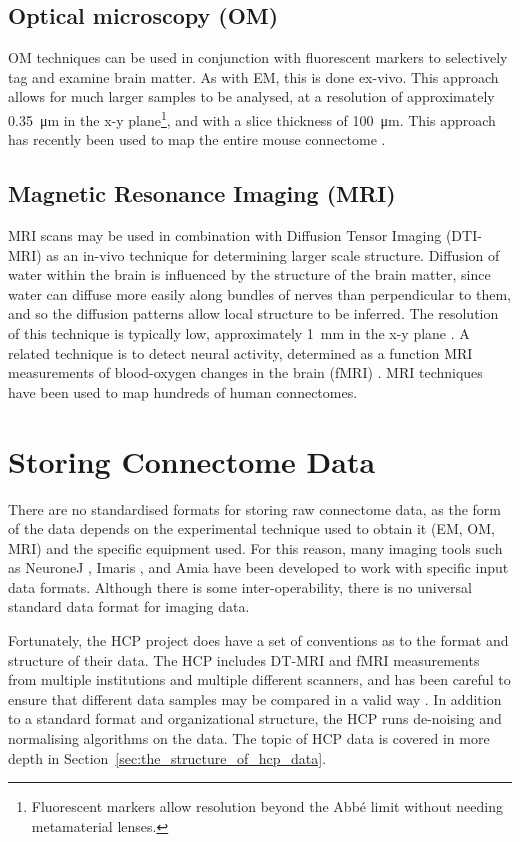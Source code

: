\documentclass[MSc,paper=a4,pagesize=auto]{icldt}
\begin{document}
\subsection{Optical microscopy (OM)} 
OM techniques can be used in conjunction with fluorescent markers to selectively tag and examine brain matter. As with EM, this is done ex-vivo. This approach allows for much larger samples to be analysed, at a resolution of approximately \SI{0.35}{\um} in the x-y plane\footnote{Fluorescent markers allow resolution beyond the Abbé limit without needing metamaterial lenses.}, and with a slice thickness of \SI{100}{\um}. This approach has recently been used to map the entire mouse connectome \cite{Oh2014}. 

\subsection{Magnetic Resonance Imaging (MRI)} 
MRI scans may be used in combination with Diffusion Tensor Imaging (DTI-MRI) as an in-vivo technique for determining larger scale structure. Diffusion of water within the brain is influenced by the structure of the brain matter, since water can diffuse more easily along bundles of nerves than perpendicular to them, and so the diffusion patterns allow local structure to be inferred. The resolution of this technique is typically low, approximately \SI{1}{\mm} in the x-y plane \cite{Westin2002}. A related technique is to detect neural activity, determined as a function MRI measurements of blood-oxygen changes in the brain (fMRI) \cite{Huettel2004}. MRI techniques have been used to map hundreds of human connectomes. 


\section{Storing Connectome Data}
There are no standardised formats for storing raw connectome data, as the form of the data depends on the experimental technique used to obtain it (EM, OM, MRI) and the specific equipment used. For this reason, many imaging tools such as NeuroneJ \cite{NeuronJ2014}, Imaris \cite{Imaris2014}, and Amia \cite{Amira2014} have been developed to work with specific input data formats. Although there is some inter-operability, there is no universal standard data format for imaging data. 

Fortunately, the HCP project does have a set of conventions as to the format and structure of their data. The HCP includes DT-MRI and fMRI measurements from multiple institutions and multiple different scanners, and has been careful to ensure that different data samples may be compared in a valid way \cite{HCP_Logistics_2014}.  In addition to a standard format and organizational structure, the HCP runs de-noising and normalising algorithms on the data. The topic of HCP data is covered in more depth in Section~\ref{sec:the_structure_of_hcp_data}.
\end{document}
